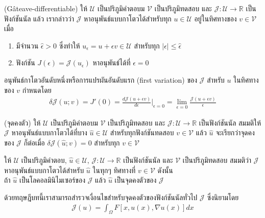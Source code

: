 \begin{Definition}
    (G\^{a}teave-differentiable)
    ให้ $\mathcal{U}$ เป็นปริภูมิคำตอบม $\mathcal{V}$ เป็นปริภูมิทดสอบ และ $\mathcal{J} : \mathcal{U} \rightarrow \mathbb{R}$ เป็นฟังก์ชันนัล แล้ว เรากล่าวว่า $\mathcal{J}$ หาอนุพันธ์แบบกาโตวได้สำหรับทุก $u \in \mathcal{U}$ อยู่ในทิศทางของ $v \in \mathcal{V}$ เมื่อ
    \begin{enumerate}
        \item มีจำนวน $\hat{\epsilon} > 0$ ซึ่งทำให้ $u_{\epsilon} = u + \epsilon v \in \mathcal{U}$ สำหรับทุก $|\epsilon| \leq \hat{\epsilon}$
        \item ฟังก์ชัน $J(\epsilon) = \mathcal{J}(u_\epsilon)$ หาอนุพันธ์ได้ที่ $\epsilon = 0$
    \end{enumerate}
    อนุพันธ์กาโตวอันดับหนึ่งหรือการแปรผันอันดับแรก (first variation) ของ $\mathcal{J}$ สำหรับ $u$ ในทิศทางของ $v$ กำหนดโดย
    \begin{align*}
        \delta \mathcal{J}(u;v) = J'(0) = \frac{d\mathcal{J}(u + \epsilon v)}{d \epsilon} \Big|_{\epsilon = 0} = \lim_{\epsilon = 0}\frac{\mathcal{J}(u + \epsilon v)}{\epsilon} 
    \end{align*}
\end{Definition}

\begin{Definition}
(จุดคงตัว) ให้ $\mathcal{U}$ เป็นปริภูมิคำตอบม $\mathcal{V}$ เป็นปริภูมิทดสอบ และ $\mathcal{J} : \mathcal{U} \rightarrow \mathbb{R}$ เป็นฟังก์ชันนัล สมมติให้ $\mathcal{J}$ หาอนุพันธ์แบบกาโตวได้ที่บาง $\hat{u} \in \mathcal{U}$ สำหรับทุกฟังก์ชันทดสอบ $v \in \mathcal{V}$ แล้ว $\hat{u}$ จะเรียกว่าจุดคงของ $\mathcal{J}$ ก็ต่อเมื่อ $\delta\mathcal{J}(\hat{u};v) = 0$ สำหรับทุก $v \in \mathcal{V}$
\end{Definition}

\begin{Theorem}
    ให้ $\mathcal{U}$ เป็นปริภูมิคำตอบ, $\hat{u} \in \mathcal{U}$, $\mathcal{J} : \mathcal{U} \rightarrow \mathbb{R}$ เป็นฟังก์ชันนัล และ $\mathcal{V}$ เป็นปริภูมิทดสอบ สมมติว่า $\mathcal{J}$ หาอนุพันธ์แบบกาโตวได้สำหรับ $\hat{u}$ ในทุกๆ ทิศทางที่ $v \in \mathcal{V}$ ดังนั้น
    \\
    \hspace{1cm} ถ้า $\hat{u}$ เป็นโลคอลมินิไมเซอร์ของ $\mathcal{J}$ แล้ว $\hat{u}$ เป็นจุดคงตัวของ  $\mathcal{J}$\\
    \label{theroem:nessery_minimizer}
\end{Theorem}
\hspace{1cm} ด้วยทฤษฎีบทนี้เราสามารถสำรวจเงื่อนไขสำหรับจุดคงตัวของฟังก์ชันนัลทั่วไป $\mathcal{J}$ ซึ่งนิยามโดย
\begin{align}
    \mathcal{J}(u) = \int_{\Omega} F[x,u(x),\nabla u(x)] dx
    \label{equation:general_functional}
\end{align}

